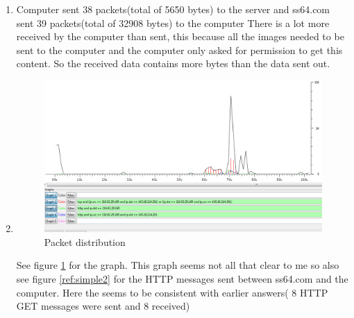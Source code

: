 \documentclass[12pt]{article} %
\begin{document}
\begin{enumerate}
        do have to make certain that the things you want to print are opened in
        the list of information when you double click on a packet).
        The packets from which the messages were extracted are \texttt{GET
        /bash/ping.html HTTP/1.1} (entry 86) and  \texttt{HTTP/1.1 200 OK
        (text/html)} (entry 114). The messages can be seen in Appendix A(at the
        back).
    \item 
        Computer sent 38 packets(total of 5650 bytes) to the server and
        ss64.com sent
        39 packets(total of 32908 bytes) to the computer
        There is a lot more received by the computer than sent, this because all the images needed to
        be sent to the computer and the computer only asked for permission to
        get this content. So the received data contains more bytes than the
        data sent out.
   \item
    \begin{figure}[l!]
        \centering
        \includegraphics[width=1.2\textwidth]{data.png}
        \caption{Packet distribution}
        \label{ref:simple}
    \end{figure}

    See figure \ref{ref:simple} for the graph. This graph seems not all that
    clear to me so also see figure \ref{ref:simple2} for the HTTP messages sent between
    ss64.com and the computer. Here the seems to be consistent with
    earlier answers( 8 HTTP GET messages were sent and 8 received)



\end{enumerate}
\end{document}
